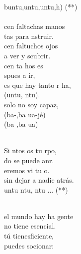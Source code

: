 \begin{cancion}%
	buntu,untu,untu,h) (**)\\
\jump\\
	cen faltachas manos \\
	tas para nstruir.\\
	cen faltuchos ojos \\
	a ver y scubrir.\\
	cen ta hos es \\
	spues a ir,\\
	es que hay tanto r ha,\\
	(untu, ntu).\\
	solo no soy capaz,\\
	(ba-,ba ua-jé)\\
	(ba-,ba ua)\\\jump\\
	\begin{chorus}%
	Si ntos os tu rpo,\\
	do se puede anr.\\
	eremos vi tu o. \\
sin dejar a nadie atrás.\\
	untu ntu, ntu ... (**)\\
	\end{chorus}%
	\jump\\
	 el mundo hay ha gente \\
	 no tiene  esencial.\\
	 tú tienesficiente, \\
	puedes socionar:\\

\end{cancion}
